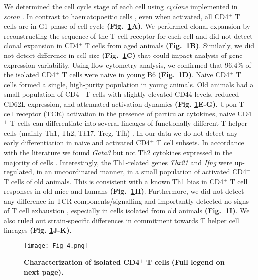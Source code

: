 We determined the cell cycle stage of each cell using \emph{cyclone} \citep{Scialdone2015} implemented in \emph{scran} \citep{Lun2016}.
In contrast to haematopoeitic cells \citep{Kowalczyk2015}, even when activated, all CD4$^+$ T cells are in G1 phase of cell cycle \textbf{(Fig.~\ref{fig1:characterization}A)}. We performed clonal expansion by reconstructing the sequence of the T cell receptor for each cell \citep{Stubbington2015} and did not detect clonal expansion in CD4$^+$ T cells from aged animals \textbf{(Fig.~\ref{fig1:characterization}B)}. Similarly, we did not detect difference in cell size \textbf{(Fig.~\ref{fig1:characterization}C)} that could impact analysis of gene expression variability. Using flow cytometry analysis, we confirmed that 96.4\% of the isolated CD4$^+$ T cells were naive in young B6 \textbf{(Fig.~\ref{fig1:characterization}D)}. Naive CD4$^+$ T cells formed a single, high-purity population in young animals. Old animals had a small population of CD4$^+$ T cells with slightly elevated CD44 levels, reduced CD62L expression, and attenuated activation dynamics \textbf{(Fig. \ref{fig1:characterization}E-G)}. Upon T cell receptor (TCR) activation in the presence of particular cytokines, naive CD4$^+$ T cells can differentiate into several lineages of functionally different T helper cells (mainly Th1, Th2, Th17, Treg, Tfh) \citep{Stubbington2015, Zhu2010}. In our data we do not detect any early differentiation in naive and activated CD4$^+$ T cell subsets. In accordance with the literature we found \textit{Gata3} but not Th2 cytokines expressed in the majority of cells  \citep{Ho2009}. Interestingly, the Th1-related genes \textit{Tbx21} and \textit{Ifng} were up-regulated, in an uncoordinated manner, in a small population of activated CD4$^+$ T cells of old animals. This is consistent with a known Th1 bias in CD4$^+$ T cell responses in old mice \citep{Zhang2014} and humans \citep{Sakata-Kaneko2000} \textbf{(Fig.~\ref{fig1:characterization}H)}. Furthermore, we did not detect any difference in TCR components/signalling and importantly detected no signs of T cell exhaustion \citep{Wherry2011}, especially in cells isolated from old animals \textbf{(Fig.~\ref{fig1:characterization}I)}. We also ruled out strain-specific differences in commitment towards T helper cell lineages \textbf{(Fig. \ref{fig1:characterization}J-K)}. 

\newpage

\begin{figure}[!hb]
\centering
\texttt{[image: Fig\_4.png]}
\caption[Characterization of isolated CD4$^+$ T cells]{\textbf{Characterization of isolated CD4$^+$ T cells (Full legend on next page).}}
\label{fig1:characterization}
\end{figure}

